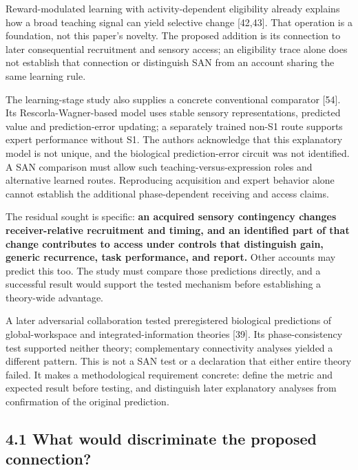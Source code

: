 \documentclass[
  american,
  11pt,
  letterpaper,
]{article}
\begin{document}
Reward-modulated learning with activity-dependent eligibility already explains how a broad teaching signal can yield selective change {[}42,43{]}. That operation is a foundation, not this paper's novelty. The proposed addition is its connection to later consequential recruitment and sensory access; an eligibility trace alone does not establish that connection or distinguish SAN from an account sharing the same learning rule.

The learning-stage study also supplies a concrete conventional comparator {[}54{]}. Its Rescorla-Wagner-based model uses stable sensory representations, predicted value and prediction-error updating; a separately trained non-S1 route supports expert performance without S1. The authors acknowledge that this explanatory model is not unique, and the biological prediction-error circuit was not identified. A SAN comparison must allow such teaching-versus-expression roles and alternative learned routes. Reproducing acquisition and expert behavior alone cannot establish the additional phase-dependent receiving and access claims.

The residual sought is specific: \textbf{an acquired sensory contingency changes receiver-relative recruitment and timing, and an identified part of that change contributes to access under controls that distinguish gain, generic recurrence, task performance, and report.} Other accounts may predict this too. The study must compare those predictions directly, and a successful result would support the tested mechanism before establishing a theory-wide advantage.

A later adversarial collaboration tested preregistered biological predictions of global-workspace and integrated-information theories {[}39{]}. Its phase-consistency test supported neither theory; complementary connectivity analyses yielded a different pattern. This is not a SAN test or a declaration that either entire theory failed. It makes a methodological requirement concrete: define the metric and expected result before testing, and distinguish later explanatory analyses from confirmation of the original prediction.

\subsection{4.1 What would discriminate the proposed connection?}\label{what-would-discriminate-the-proposed-connection}
\end{document}

